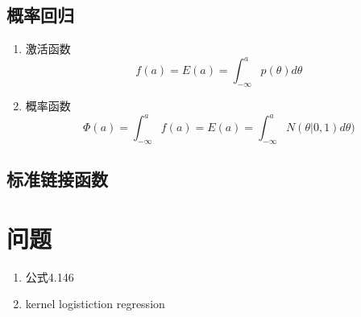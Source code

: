 \subsection{概率回归}
\begin{enumerate}
\item 激活函数
\begin{equation}
f(a) = E(a) = \int_{-\infty}^ap(\theta)d\theta
\end{equation}
\item 概率函数
\begin{equation}
\Phi(a) = \int_{-\infty}^a
f(a) = E(a) = \int_{-\infty}^aN(\theta|0, 1)d\theta)
\end{equation}
\end{enumerate}
\subsection{标准链接函数}
\section{问题}
\begin{enumerate}
\item 公式4.146
\item kernel logistiction regression
\end{enumerate}
